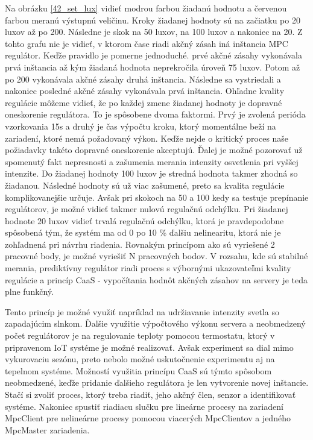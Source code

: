 Na obrázku \ref{42_set_lux} vidieť modrou farbou žiadanú hodnotu a červenou farbou meranú výstupnú veličinu. Kroky žiadanej hodnoty sú na začiatku po 20 luxov až po 200. Následne je skok na 50 luxov, na 100 luxov a nakoniec na 20. Z tohto grafu nie je vidieť, v ktorom čase riadi akčný zásah iná inštancia MPC regulátor. Keďže pravidlo je pomerne jednoduché. prvé akčné zásahy vykonávala prvá inštancia až kým žiadaná hodnota neprekročila úroveň 75 luxov. Potom až po 200 vykonávala akčné zásahy druhá inštancia. Následne sa vystriedali a nakoniec posledné akčné zásahy vykonávala prvá inštancia. Ohľadne kvality regulácie môžeme vidieť, že po každej zmene žiadanej hodnoty je dopravné oneskorenie regulátora. To je spôsobene dvoma faktormi. Prvý je zvolená perióda vzorkovania 15s a druhý je čas výpočtu kroku, ktorý momentálne beží na zariadení, ktoré nemá požadovaný výkon. Keďže nejde o kritický proces naše požiadavky takéto dopravné oneskorenie akceptujú. Ďalej je možné pozorovať už spomenutý fakt nepresnosti a zašumenia merania intenzity osvetlenia pri vyššej intenzite. Do žiadanej hodnoty 100 luxov je stredná hodnota takmer zhodná so žiadanou. Následné hodnoty sú už viac zašumené, preto sa kvalita regulácie komplikovanejšie určuje. Avšak pri skokoch na 50 a 100 kedy sa testuje prepínanie regulátorov, je možné vidieť takmer nulovú regulačnú odchýlku. Pri žiadanej hodnote 20 luxov vidieť trvalá regulačnú odchýlku, ktorá je pravdepodobne spôsobená tým, že systém ma od 0 po 10 \% ďalšiu nelinearitu, ktorá nie je zohľadnená pri návrhu riadenia. Rovnakým princípom ako sú vyriešené 2 pracovné body, je možné vyriešiť N pracovných bodov. V rozsahu, kde sú stabilné merania, prediktívny regulátor riadi proces s výbornými ukazovateľmi kvality regulácie a princíp CaaS - vypočítania hodnôt akčných zásahov na servery je teda plne funkčný.

\indent Tento princíp je možné využiť napríklad na udržiavanie intenzity svetla so zapadajúcim slnkom. Ďalšie využitie výpočtového výkonu servera a neobmedzený počet regulátorov je na regulovanie teploty pomocou termostatu, ktorý v pripravenom IoT systéme je možné realizovať. Avšak experiment sa dial mimo vykurovaciu sezónu, preto nebolo možné uskutočnenie experimentu aj na tepelnom systéme. Možností využitia princípu CaaS sú týmto spôsobom neobmedzené, keďže pridanie ďalšieho regulátora je len vytvorenie novej inštancie. Stačí si zvoliť proces, ktorý treba riadiť, jeho akčný člen, senzor a identifikovať systéme. Nakoniec spustiť riadiacu slučku pre lineárne procesy na zariadení MpcClient pre nelineárne procesy pomocou viacerých MpcClientov a jedného MpcMaster zariadenia.

